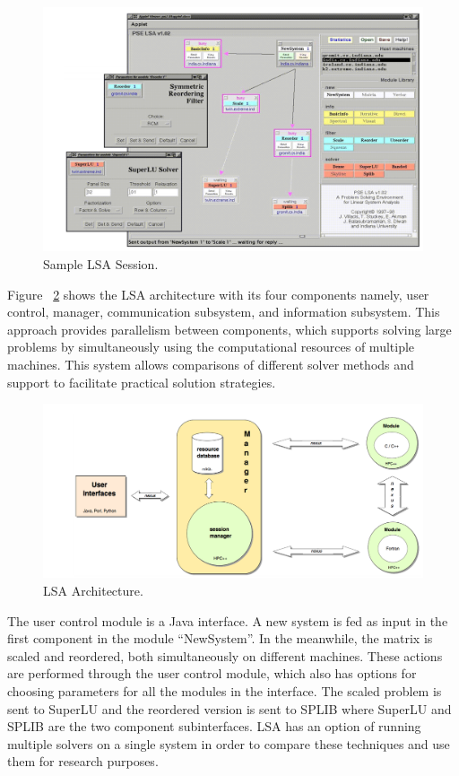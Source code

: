 \begin{figure}[htp]
\begin{center}
 \includegraphics[width=0.9\linewidth]{figures/lsa1.png}
\end{center}
 \caption{Sample LSA Session.}
 \label{fig:lsa1}
\end{figure}

Figure ~\ref{fig:lsa} shows the LSA architecture with its four components namely, user control, manager, communication subsystem, and information subsystem.
This approach provides parallelism between components, which supports solving large problems by simultaneously using the computational resources of multiple machines. This system allows comparisons of different solver methods and support to facilitate practical solution strategies. 

\begin{figure}[htp]
\begin{center}
 \includegraphics[width=0.9\linewidth]{figures/lsa.png}
\end{center}
 \caption{LSA Architecture.}
 \label{fig:lsa}
\end{figure}


The user control module is a Java interface. A new system is fed as input in the 
first component in the module ``NewSystem''. In the meanwhile, the matrix is scaled and reordered, both simultaneously on different machines. These actions are performed through the user control module, which also has options for choosing parameters for all the modules in the interface. The scaled problem is sent to SuperLU and the reordered version is sent to SPLIB where SuperLU and SPLIB are the two component subinterfaces. LSA has an option of running multiple solvers on a single system in order to compare these techniques and use them for research purposes.

